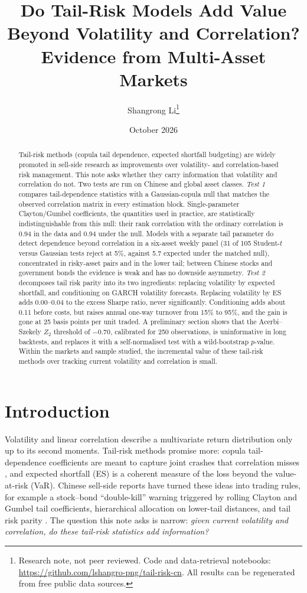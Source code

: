 \documentclass[11pt]{article}
\title{Do Tail-Risk Models Add Value Beyond Volatility and Correlation?\\
\large Evidence from Multi-Asset Markets}
\author{Shangrong Li\thanks{Research note, not peer reviewed. Code and data-retrieval notebooks:
\url{https://github.com/lshangro-png/tail-risk-cn}. All results can be regenerated from free public data sources.}}
\date{October 2026}
\newcommand{\1}{\mathbf{1}}
\begin{document}
\maketitle

\begin{abstract}
\noindent
Tail-risk methods (copula tail dependence, expected shortfall budgeting) are widely promoted in sell-side
research as improvements over volatility- and correlation-based risk management. This note asks whether they
carry information that volatility and correlation do not. Two tests are run on Chinese and global asset
classes. \emph{Test 1} compares tail-dependence statistics with a Gaussian-copula null that matches the
observed correlation matrix in every estimation block. Single-parameter Clayton/Gumbel coefficients, the
quantities used in practice, are statistically indistinguishable from this null: their rank correlation with
the ordinary correlation is 0.94 in the data and 0.94 under the null. Models with a separate tail parameter
do detect dependence beyond correlation in a six-asset weekly panel (31 of 105 Student-$t$ versus Gaussian
tests reject at 5\%, against 5.7 expected under the matched null), concentrated in risky-asset pairs and in the
lower tail; between Chinese stocks and government bonds the evidence is weak and has no downside asymmetry.
\emph{Test 2} decomposes tail risk parity into its two ingredients: replacing volatility by expected
shortfall, and conditioning on GARCH volatility forecasts. Replacing volatility by ES adds 0.00--0.04 to the
excess Sharpe ratio, never significantly. Conditioning adds about 0.11 before costs, but raises annual
one-way turnover from 15\% to 95\%, and the gain is gone at 25 basis points per unit traded. A preliminary
section shows that the Acerbi--Szekely $Z_2$ threshold of $-0.70$, calibrated for 250 observations, is
uninformative in long backtests, and replaces it with a self-normalised test with a wild-bootstrap $p$-value.
Within the markets and sample studied, the incremental value of these tail-risk methods over tracking current
volatility and correlation is small.
\end{abstract}

\section{Introduction}

Volatility and linear correlation describe a multivariate return distribution only up to its second moments.
Tail-risk methods promise more: copula tail-dependence coefficients are meant to capture joint crashes that
correlation misses \citep{embrechts2002}, and expected shortfall (ES) is a coherent measure of the loss beyond
the value-at-risk (VaR). Chinese sell-side reports have turned these ideas into trading rules, for example a
stock--bond ``double-kill'' warning triggered by rolling Clayton and Gumbel tail coefficients, hierarchical
allocation on lower-tail distances, and tail risk parity \citep{alankar2013}. The question this note asks is
narrow: \emph{given current volatility and correlation, do these tail-risk statistics add information?}
\end{document}

